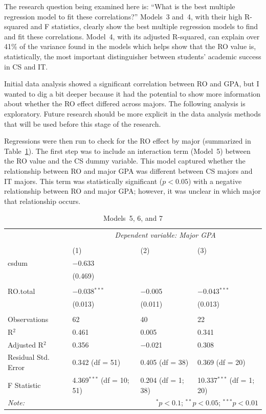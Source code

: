 The research question being examined here is: ``What is the best multiple regression model to fit these correlations?'' Models~3 and~4, with their high R-squared and F statistics, clearly show the best multiple regression models to find and fit these correlations. Model~4, with its adjusted R-squared, can explain over 41\% of the variance found in the models which helps show that the RO value is, statistically, the most important distinguisher between students' academic success in CS and IT.

Initial data analysis showed a significant correlation between RO and GPA, but I wanted to dig a bit deeper because it had the potential to show more information about whether the RO effect differed across majors. The following analysis is exploratory. Future research should be more explicit in the data analysis methods that will be used before this stage of the research.

Regressions were then run to check for the RO effect by major (summarized in Table~\ref{tab:models567}). The first step was to include an interaction term (Model~5) between the RO value and the CS dummy variable. This model captured whether the relationship between RO and major GPA was different between CS majors and IT majors. This term was statistically significant ($p<0.05$) with a negative relationship between RO and major GPA; however, it was unclear in which major that relationship occurs.

\begin{table}[!htbp]
  \centering
  \caption{Models~5, 6, and 7}
  \label{tab:models567}
  \begin{tabular}{@{\extracolsep{5pt}}llll}
    \toprule
     & \multicolumn{3}{c}{\textit{Dependent variable: Major GPA}} \\
    \cmidrule{2-4}
    \\[-1.8ex] & (1) & (2) & (3)\\
    \midrule
    csdum & $-$0.633 &  &  \\
      & (0.469) &  &  \\
      & & & \\
    RO.total & $-$0.038$^{***}$ & $-$0.005 & $-$0.043$^{***}$ \\
      & (0.013) & (0.011) & (0.013) \\
      & & & \\
    \midrule
    Observations & 62 & 40 & 22 \\
    R$^{2}$ & 0.461 & 0.005 & 0.341 \\
    Adjusted R$^{2}$ & 0.356 & $-$0.021 & 0.308 \\
    Residual Std. Error & 0.342 (df = 51) & 0.405 (df = 38) & 0.369 (df = 20) \\
    F Statistic & 4.369$^{***}$ (df = 10; 51) & 0.204 (df = 1; 38) & 10.337$^{***}$ (df = 1; 20) \\
    \bottomrule
    \textit{Note:}  & \multicolumn{3}{r}{$^{*}p<0.1$; $^{**}p<0.05$; $^{***}p<0.01$} \\
  \end{tabular}
\end{table}

